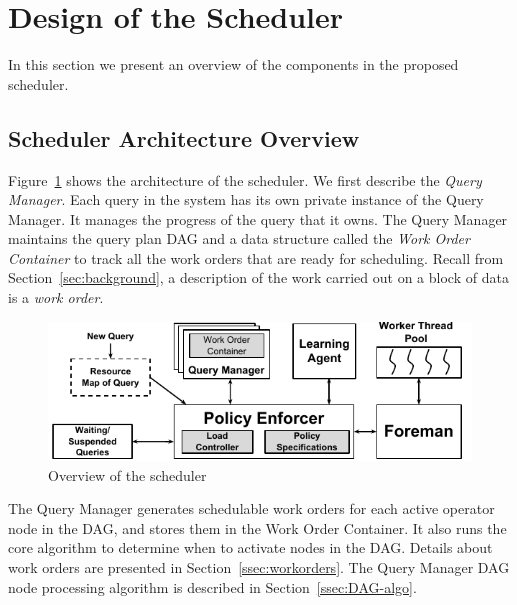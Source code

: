 \section{Design of the Scheduler}\label{sec:design}
In this section we present an overview of the components in the proposed \sys{} scheduler.

\subsection{Scheduler Architecture Overview}\label{ssec:scheduler-arch}
Figure~\ref{fig:scheduler-architecture} shows the architecture of the \sys{} scheduler.
We first describe the \textit{Query Manager}. 
Each query in the system has its own private instance of the Query Manager.
It manages the progress of the query that it owns.
The Query Manager maintains the query plan DAG and a data structure called
the \textit{Work Order Container} to track all the work orders that are ready for
scheduling. 
Recall from Section~\ref{sec:background}, a description of the work 
carried out on a block of data is a \textit{work order}. 

\begin{figure}
	\centering
	\includegraphics[width=\columnwidth]{figures/Scheduler-Architecture.pdf}
	\vspace*{-1.5em}
	\caption{Overview of the scheduler}
	\label{fig:scheduler-architecture}
	\vspace*{-1.5em}
\end{figure}

The Query Manager generates schedulable work orders for each active operator node
in the DAG, and stores them in the Work Order Container.
It also runs the core algorithm to determine when to activate nodes in the DAG. 
Details about work orders are presented in Section~\ref{ssec:workorders}.
The Query Manager DAG node processing algorithm is described in
Section~\ref{ssec:DAG-algo}. 

